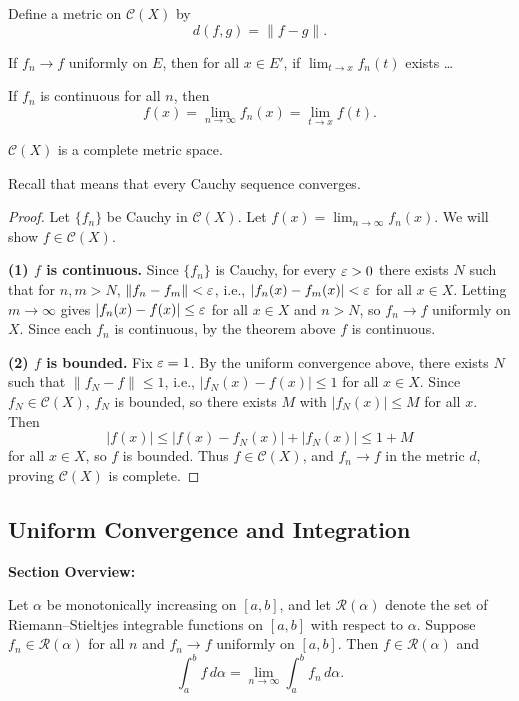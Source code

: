 \documentclass[../master/master.tex]{subfiles}
\begin{document}
Define a metric on $\mathscr{C}(X)$ by
\[
d(f, g) = \|f - g\|.
\]

\begin{theorem}
If $f_n \to f$ uniformly on $E$, then for all $x \in E'$, if $\lim_{t \to x} f_n(t)$ exists \ldots
\end{theorem}

\begin{theorem}
If $f_n$ is continuous for all $n$, then
\[
f(x) = \lim_{n \to \infty} f_n(x) = \lim_{t \to x} f(t).
\]
\end{theorem}

\begin{theorem}
$\mathscr{C}(X)$ is a complete metric space.
\end{theorem}

Recall that  means that every Cauchy sequence converges.

\begin{proof}
Let $\{f_n\}$ be Cauchy in $\mathscr{C}(X)$. Let $f(x) = \lim_{n \to \infty} f_n(x)$. We will show $f \in \mathscr{C}(X)$.

\textbf{(1) $f$ is continuous.} Since $\{f_n\}$ is Cauchy, for every $\varepsilon > 0$ there exists $N$ such that for $n, m > N$, $\|f_n - f_m\| < \varepsilon$, i.e., $|f_n(x) - f_m(x)| < \varepsilon$ for all $x \in X$. Letting $m \to \infty$ gives $|f_n(x) - f(x)| \leq \varepsilon$ for all $x \in X$ and $n > N$, so $f_n \to f$ uniformly on $X$. Since each $f_n$ is continuous, by the theorem above $f$ is continuous.

\textbf{(2) $f$ is bounded.} Fix $\varepsilon = 1$. By the uniform convergence above, there exists $N$ such that $\|f_N - f\| \leq 1$, i.e., $|f_N(x) - f(x)| \leq 1$ for all $x \in X$. Since $f_N \in \mathscr{C}(X)$, $f_N$ is bounded, so there exists $M$ with $|f_N(x)| \leq M$ for all $x$. Then
\[
|f(x)| \leq |f(x) - f_N(x)| + |f_N(x)| \leq 1 + M
\]
for all $x \in X$, so $f$ is bounded. Thus $f \in \mathscr{C}(X)$, and $f_n \to f$ in the metric $d$, proving $\mathscr{C}(X)$ is complete.
\end{proof}

\subsection{Uniform Convergence and Integration}

\begin{summarybox}
\textbf{Section Overview:}
\end{summarybox}

\begin{theorem}
Let $\alpha$ be monotonically increasing on $[a,b]$, and let $\mathscr{R}(\alpha)$ denote the set of Riemann--Stieltjes integrable functions on $[a,b]$ with respect to $\alpha$. Suppose $f_n \in \mathscr{R}(\alpha)$ for all $n$ and $f_n \to f$ uniformly on $[a,b]$. Then $f \in \mathscr{R}(\alpha)$ and
\[
\int_a^b f\,d\alpha = \lim_{n \to \infty} \int_a^b f_n\,d\alpha.
\]
\end{theorem}
\end{document}
